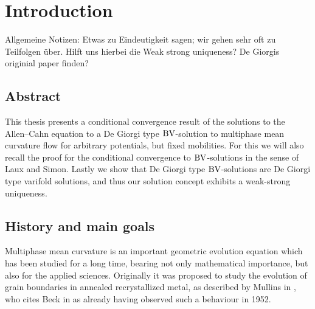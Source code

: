 \chapter{Introduction}

Allgemeine Notizen: 
Etwas zu Eindeutigkeit sagen; wir gehen sehr oft zu Teilfolgen über. Hilft uns 
hierbei die Weak strong uniqueness?
De Giorgis originial paper finden?

\section{Abstract}

This thesis presents a conditional convergence result of the solutions to the 
Allen--Cahn equation to a De Giorgi type $ \operatorname{BV} $-solution to multiphase mean 
curvature flow for arbitrary potentials, but fixed mobilities. For this we will 
also recall the proof for the conditional convergence to $ \operatorname{BV} $-solutions in 
the sense of Laux and Simon. Lastly we show that De Giorgi type $ \operatorname{BV} 
$-solutions are De 
Giorgi type varifold solutions, and thus our solution concept exhibits a 
weak-strong uniqueness.

\section{History and main goals}

Multiphase mean curvature is an important geometric evolution equation which 
has been studied for a long time, bearing not only mathematical importance, but 
also for the applied sciences. Originally it was proposed to study the 
evolution of grain boundaries in annealed recrystallized metal, as described by
Mullins in \cite{mullins_two_dimensional_motion_of_idealized_grain_boundaries}, 
who cites Beck in \cite{beck_metal_interfaces} as already having observed such 
a behaviour in 1952. 

